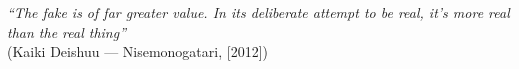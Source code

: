 \begin{epigrafe}
    \vspace*{\fill}
{%
    \noindent\hspace{.5\textwidth}
    {\begin{minipage}{.5\textwidth}
        \textit{``The fake is of far greater value. In its deliberate attempt to be real, it’s more real than the real thing''}\\(Kaiki Deishuu {---} Nisemonogatari, [2012])
    \end{minipage}}%
    \vspace*{3cm}
}%
\end{epigrafe}
